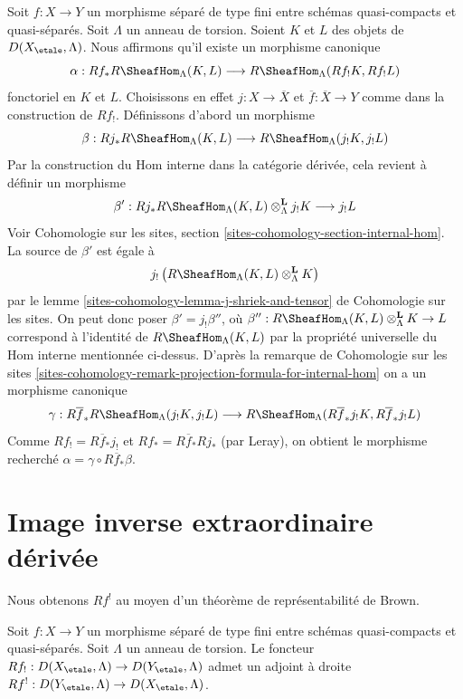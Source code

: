 \begin{remark}
\label{remark-projection-formula-for-internal-hom}
Soit $f : X \to Y$ un morphisme séparé de type fini entre schémas quasi-compacts
et quasi-séparés. Soit $\Lambda$ un anneau de torsion.
Soient $K$ et $L$ des objets de $D(X_\etale, \Lambda)$. Nous affirmons
qu'il existe un morphisme canonique
$$
\alpha :
Rf_*R\SheafHom_\Lambda(K, L)
\longrightarrow
R\SheafHom_\Lambda(Rf_!K, Rf_!L)
$$
fonctoriel en $K$ et $L$. Choisissons en effet $j : X \to \overline{X}$ et
$\overline{f} : \overline{X} \to Y$ comme dans la construction de $Rf_!$.
Définissons d'abord un morphisme
$$
\beta :
Rj_*R\SheafHom_\Lambda(K, L)
\longrightarrow
R\SheafHom_\Lambda(j_!K, j_!L)
$$
Par la construction du Hom interne dans la catégorie dérivée, cela revient
à définir un morphisme
$$
\beta' :
Rj_*R\SheafHom_\Lambda(K, L) \otimes_\Lambda^\mathbf{L} j_!K
\longrightarrow
j_!L
$$
Voir Cohomologie sur les sites, section \ref{sites-cohomology-section-internal-hom}.
La source de $\beta'$ est égale à
$$
j_!\left(R\SheafHom_\Lambda(K, L) \otimes_\Lambda^\mathbf{L} K\right)
$$
par le lemme \ref{sites-cohomology-lemma-j-shriek-and-tensor} de Cohomologie sur les sites.
On peut donc poser $\beta' = j_!\beta''$, où
$\beta'' : R\SheafHom_\Lambda(K, L) \otimes_\Lambda^\mathbf{L} K \to L$
correspond à l'identité de $R\SheafHom_\Lambda(K, L)$
par la propriété universelle du Hom interne mentionnée ci-dessus. D'après la
remarque de Cohomologie sur les sites
\ref{sites-cohomology-remark-projection-formula-for-internal-hom}
on a un morphisme canonique
$$
\gamma :
R\overline{f}_*R\SheafHom_\Lambda(j_!K, j_!L)
\longrightarrow
R\SheafHom_\Lambda(R\overline{f}_*j_!K, R\overline{f}_*j_!L)
$$
Comme $Rf_! = R\overline{f}_*j_!$ et $Rf_* = R\overline{f}_* Rj_*$
(par Leray), on obtient le morphisme recherché
$\alpha = \gamma \circ R\overline{f}_*\beta$.
\end{remark}









\section{Image inverse extraordinaire dérivée}
\label{section-derived-upper-shriek}

\noindent
Nous obtenons $Rf^!$ au moyen d'un théorème de représentabilité de Brown.

\begin{lemma}
\label{lemma-upper-shriek-derived}
Soit $f : X \to Y$ un morphisme séparé de type fini entre schémas quasi-compacts
et quasi-séparés. Soit $\Lambda$ un anneau de torsion.
Le foncteur
$Rf_! : D(X_\etale, \Lambda) \to D(Y_\etale, \Lambda)$
admet un adjoint à droite
$Rf^! : D(Y_\etale, \Lambda) \to D(X_\etale, \Lambda)$.
\end{lemma}

